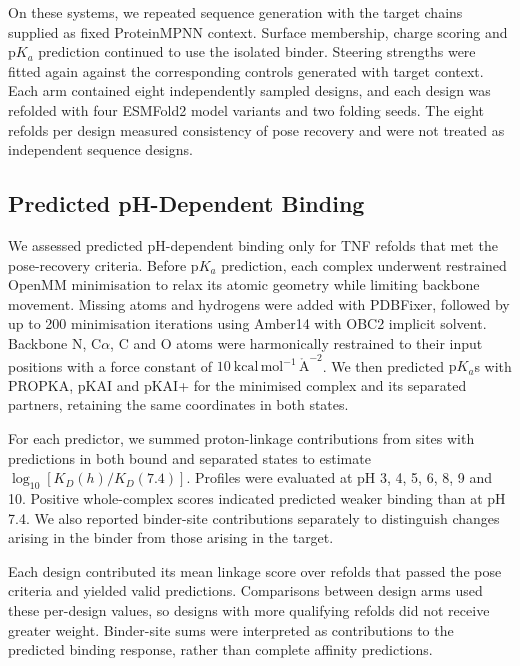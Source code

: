 On these systems, we repeated sequence generation with the target chains supplied as fixed ProteinMPNN context. Surface membership, charge scoring and $\mathrm{p}K_a$ prediction continued to use the isolated binder. Steering strengths were fitted again against the corresponding controls generated with target context. Each arm contained eight independently sampled designs, and each design was refolded with four ESMFold2 model variants and two folding seeds. The eight refolds per design measured consistency of pose recovery and were not treated as independent sequence designs.

\subsection{Predicted pH-Dependent Binding}
\label{app:jaxka-design-binding-evaluation}

We assessed predicted pH-dependent binding only for TNF refolds that met the pose-recovery criteria. Before $\mathrm{p}K_a$ prediction, each complex underwent restrained OpenMM minimisation to relax its atomic geometry while limiting backbone movement.\supercite{eastmanOpenMM7Rapid2017} Missing atoms and hydrogens were added with PDBFixer, followed by up to 200 minimisation iterations using Amber14 with OBC2 implicit solvent. Backbone N, C$\alpha$, C and O atoms were harmonically restrained to their input positions with a force constant of $10\ \mathrm{kcal\,mol^{-1}\,\mathring{A}^{-2}}$. We then predicted $\mathrm{p}K_a$s with PROPKA, pKAI and pKAI+ for the minimised complex and its separated partners, retaining the same coordinates in both states.

For each predictor, we summed proton-linkage contributions from sites with predictions in both bound and separated states to estimate $\log_{10}[K_D(h)/K_D(7.4)]$. Profiles were evaluated at pH 3, 4, 5, 6, 8, 9 and 10. Positive whole-complex scores indicated predicted weaker binding than at pH 7.4. We also reported binder-site contributions separately to distinguish changes arising in the binder from those arising in the target.

Each design contributed its mean linkage score over refolds that passed the pose criteria and yielded valid predictions. Comparisons between design arms used these per-design values, so designs with more qualifying refolds did not receive greater weight. Binder-site sums were interpreted as contributions to the predicted binding response, rather than complete affinity predictions.

